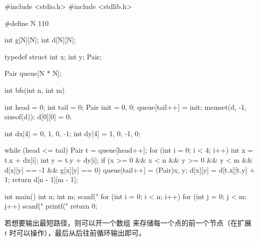 \begin{mycpptwocol}
    #include <stdio.h>
    #include <stdlib.h>

    #define N 110

    int g[N][N];
    int d[N][N];

    typedef struct {
        int x;
        int y;
    } Pair;

    Pair queue[N * N];

    int bfs(int n, int m) {
        int head = 0;
        int tail = 0;
        Pair init = {0, 0};
        queue[tail++] = init;
        memset(d, -1, sizeof(d));
        d[0][0] = 0;

        int dx[4] = {0, 1, 0, -1};
        int dy[4] = {1, 0, -1, 0};

        while (head <= tail) {
            Pair t = queue[head++];
            for (int i = 0; i < 4; i++) {
                int x = t.x + dx[i];
                int y = t.y + dy[i];
                if (x >= 0 && x < n && y >= 0 && y < m && d[x][y] == -1 && g[x][y] == 0) {
                    queue[tail++] = (Pair){x, y};
                    d[x][y] = d[t.x][t.y] + 1;
                }
            }
        }
        return d[n - 1][m - 1];
    }

    int main() {
        int n;
        int m;
        scanf("%
        for (int i = 0; i < n; i++) {
            for (int j = 0; j < m; j++) {
                scanf("%
            }
        }
        printf("%
        return 0;
    }
\end{mycpptwocol}

\begin{information}
    若想要输出最短路径，则可以开一个数组  来存储每一个点的前一个节点（在扩展 $t$ 时可以操作），最后从后往前循环输出即可。
\end{information}

